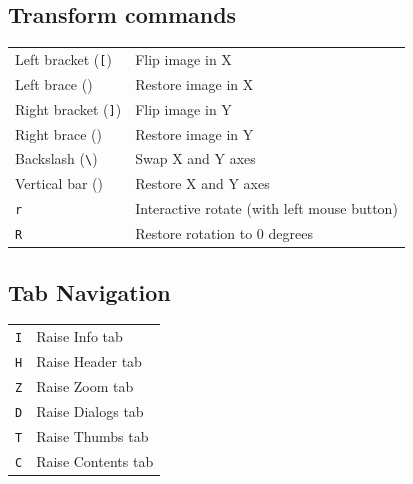 \documentclass[11pt]{report}
\begin{document}
\subsection{Transform commands}
\begin{tabularx}{\textwidth}{lX}
Left bracket ({\tt [}) & Flip image in X \\
Left brace ({\tt \textbraceleft{}}) & Restore image in X \\
Right bracket ({\tt ]}) & Flip image in Y \\
Right brace ({\tt \textbraceright{}}) & Restore image in Y \\
Backslash ({\tt \textbackslash{}}) & Swap X and Y axes \\
Vertical bar ({\tt \textbar{}}) & Restore X and Y axes \\
{\tt r} & Interactive rotate (with left mouse button) \\
{\tt R} & Restore rotation to 0 degrees \\
\end{tabularx}

\subsection{Tab Navigation}
\begin{tabularx}{\textwidth}{lX}
{\tt I} & Raise Info tab \\
{\tt H} & Raise Header tab \\
{\tt Z} & Raise Zoom tab \\
{\tt D} & Raise Dialogs tab \\
{\tt T} & Raise Thumbs tab \\
{\tt C} & Raise Contents tab \\
\end{tabularx}
\end{document}
